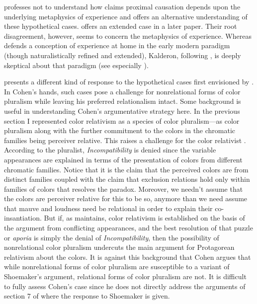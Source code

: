 \documentclass[12pt]{article}
\begin{document}
\citet[429 n35]{Pautz:2011aa} professes not to understand how claims proximal causation depends upon the underlying metaphysics of experience and offers an alternative understanding of these hypothetical cases. \citet{Pautz:2013pa} offers an extended case in a later paper. Their root disagreement, however, seems to concern the metaphysics of experience. Whereas \citet{Pautz:2011aa} defends a conception of experience at home in the early modern paradigm (though naturalistically refined and extended), Kalderon, following \citet{Putnam:1994kx}, is deeply skeptical about that paradigm (see especially \citealt[Preface]{Kalderon:2015fr}).

\citet{Cohen:2009lq} presents a different kind of response to the hypothetical cases first envisioned by \citet{Shoemaker:2003wk}. In Cohen's hands, such cases pose a challenge for nonrelational forms of color pluralism while leaving his preferred relationalism intact. Some background is useful in understanding Cohen's argumentative strategy here. In the previous section I represented color relativism as a species of color pluralism---as color pluralism along with the further commitment to the colors in the chromatic families being perceiver relative. This raises a challenge for the color relativist \citep{Kalderon:2006tg}. According to the pluralist, \emph{Incompatibility} is denied since the variable appearances are explained in terms of the presentation of colors from different chromatic families. Notice that it is the claim that the perceived colors are from distinct families coupled with the claim that exclusion relations hold only within families of colors that resolves the paradox. Moreover, we needn't assume that the colors are perceiver relative for this to be so, anymore than we need assume that mauve and loudness need be relational in order to explain their co-insantiation. But if, as \citet{Cohen:2009lq} maintains, color relativism is established on the basis of the argument from conflicting appearances, and the best resolution of that puzzle or \emph{aporia} is simply the denial of \emph{Incompatibility}, then the possibility of nonrelational color pluralism undercuts the main argument for Protagorean relativism about the colors. It is against this background that Cohen argues that while nonrelational forms of color pluralism are susceptible to a variant of Shoemaker's argument, relational forms of color pluralism are not. It is difficult to fully assess Cohen's case since he does not directly address the arguments of section 7 of \citet{Kalderon:2007mr} where the response to Shoemaker is given.
\end{document}
